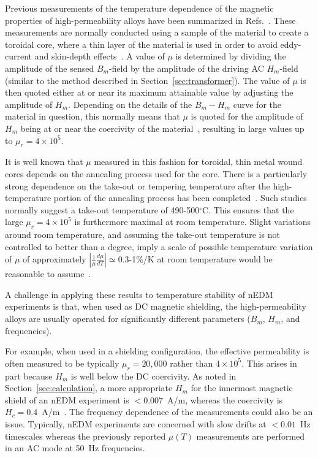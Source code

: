 \documentclass[review]{elsarticle}
\begin{document}
Previous measurements of the temperature dependence of the magnetic
properties of high-permeability alloys have been summarized in
Refs.~\cite{bib:couderchon,bib:bozorth,bib:pfeifer}.  These
measurements are normally conducted using a sample of the material to
create a toroidal core, where a thin layer of the material is used in
order to avoid eddy-current and skin-depth
effects~\cite{bib:pfeifer,bib:kruppvdm}.  A value of $\mu$ is
determined by dividing the amplitude of the sensed $B_m$-field by the
amplitude of the driving AC $H_m$-field (similar to the method
described in Section~\ref{sec:transformer}).  The value of $\mu$ is
then quoted either at or near its maximum attainable value by
adjusting the amplitude of $H_m$.  Depending on the details of the
$B_m-H_m$ curve for the material in question, this normally means that
$\mu$ is quoted for the amplitude of $H_m$ being at or near the
coercivity of the material~\cite{bib:couderchon,bib:kruppvdm},
resulting in large values up to $\mu_r=4\times 10^5$.

It is well known that $\mu$ measured in this fashion for toroidal,
thin metal wound cores depends on the annealing process used for the
core.  There is a particularly strong dependence on the take-out or
tempering temperature after the high-temperature portion of the
annealing process has been
completed~\cite{bib:pfeifer,bib:kruppvdm,bib:couderchon}.  Such
studies normally suggest a take-out temperature of 490-500$^\circ$C.
This ensures that the large $\mu_r=4\times 10^{5}$ is furthermore
maximal at room temperature.  Slight variations around room
temperature, and assuming the take-out temperature is not controlled
to better than a degree, imply a scale of possible temperature
variation of $\mu$ of approximately
$\left|\frac{1}{\mu}\frac{d\mu}{dT}\right|\simeq 0.3$-1\%/K at room
temperature would be reasonable to
assume~\cite{bib:couderchon,bib:kruppvdm}.

A challenge in applying these results to temperature stability of nEDM
experiments is that, when used as DC magnetic shielding, the
high-permeability alloys are usually operated for significantly
different parameters ($B_m$, $H_m$, and frequencies).

For example, when used in a shielding configuration, the effective
permeability is often measured to be typically $\mu_r=20,000$ rather
than $4\times 10^5$.  This arises in part because $H_m$ is well below
the DC coercivity.  As noted in Section~\ref{sec:calculation}, a more
appropriate $H_m$ for the innermost magnetic shield of an nEDM
experiment is $<0.007$~A/m, whereas the coercivity is
$H_c=0.4$~A/m~\cite{bib:kruppvdm}.  The frequency dependence of the
measurements could also be an issue.  Typically, nEDM experiments are
concerned with slow drifts at $<0.01$~Hz timescales whereas the
previously reported $\mu(T)$ measurements are performed in an AC mode
at 50~Hz frequencies.
\end{document}
